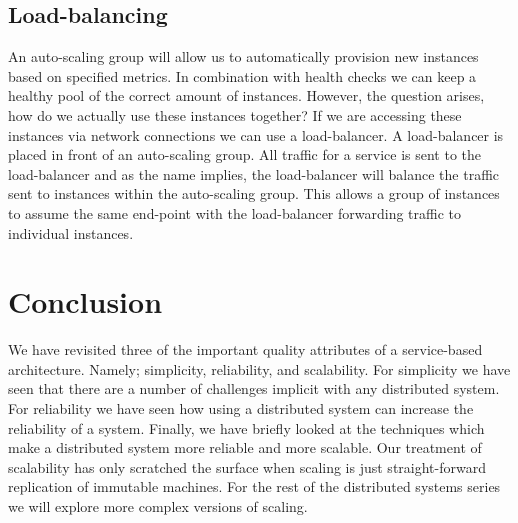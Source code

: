 \subsection{Load-balancing}

An auto-scaling group will allow us to automatically provision new instances based on specified metrics.
In combination with health checks we can keep a healthy pool of the correct amount of instances.
However, the question arises, how do we actually use these instances together?
If we are accessing these instances via network connections we can use a load-balancer.
A load-balancer is placed in front of an auto-scaling group.
All traffic for a service is sent to the load-balancer and as the name implies,
the load-balancer will balance the traffic sent to instances within the auto-scaling group.
This allows a group of instances to assume the same end-point with the load-balancer forwarding traffic to individual instances.


\section{Conclusion}
We have revisited three of the important quality attributes of a service-based architecture.
Namely; simplicity, reliability, and scalability.
For simplicity we have seen that there are a number of challenges implicit with any distributed system.
For reliability we have seen how using a distributed system can increase the reliability of a system.
Finally, we have briefly looked at the techniques which make a distributed system more reliable and more scalable.
Our treatment of scalability has only scratched the surface when scaling is just straight-forward replication of immutable machines.
For the rest of the distributed systems series we will explore more complex versions of scaling.
